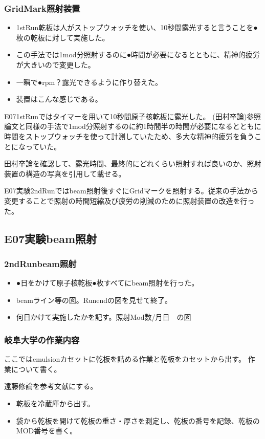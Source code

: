 \documentclass[12pt,a4paper]{jarticle}
\begin{document}
\subsubsection{GridMark照射装置}
\begin{itemize}
 \item 1stRun乾板は人がストップウォッチを使い、10秒間露光すると言うことを●枚の乾板に対して実施した。
 \item この手法では1mod分照射するのに●時間が必要になるとともに、精神的疲労が大きいので変更した。
 \item 一瞬で●rpm？露光できるように作り替えた。
 \item 装置はこんな感じである。
\end{itemize}
E071stRunではタイマーを用いて10秒間原子核乾板に露光した。
(田村卒論)参照論文と同様の手法で1mod分照射するのに約1時間半の時間が必要になるとともに時間をストップウォッチを使って計測していたため、多大な精神的疲労を負うことになっていた。
\par
田村卒論を確認して、露光時間、最終的にどれくらい照射すれば良いのか、照射装置の構造の写真を引用して載せる。
\par
E07実験2ndRunではbeam照射後すぐにGridマークを照射する。従来の手法から変更することで照射の時間短縮及び疲労の削減のために照射装置の改造を行った。
\subsection{E07実験beam照射}
\subsubsection{2ndRunbeam照射}
\begin{itemize}
 \item ●日をかけて原子核乾板●枚すべてにbeam照射を行った。
 \item beamライン等の図。Runendの図を見せて終了。
 \item 何日かけて実施したかを記す。照射Mod数/月日　の図
\end{itemize}
\subsubsection{岐阜大学の作業内容}
ここではemulsionカセットに乾板を詰める作業と乾板をカセットから出す。
作業について書く。
\par
遠藤修論を参考文献にする。
\begin{itemize}
 \item 乾板を冷蔵庫から出す。
 \item 袋から乾板を開けて乾板の重さ・厚さを測定し、乾板の番号を記録、乾板のMOD番号を書く。
\end{itemize}
\end{document}

